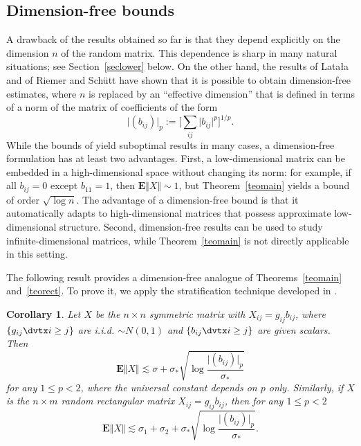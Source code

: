 \documentclass[aop,MSNbibl,dvips]{arximspdf}
\newcommand{\rrvert}{\vert}
\newcommand{\rrVert}{\Vert}
\newcommand{\llvert}{\vert}
\newcommand{\llVert}{\Vert}
\newtheorem{cor}[teo]{Corollary}
\newcommand{\EE}{\mathbf{E}}
\begin{document}
\subsection{Dimension-free bounds}\label{secdimfree}

A drawback of the results obtained so far is that they depend explicitly
on the dimension $n$ of the random matrix. This dependence is sharp in
many natural situations; see Section~\ref{seclower} below. On the other
hand, the results of Lata{\l}a \cite{Lat05} and of Riemer and Sch\"utt
\cite{RS13} have shown that it is possible to obtain dimension-free
estimates, where $n$ is replaced by an ``effective dimension'' that is
defined in terms of a norm of the matrix of coefficients of the form
%
\[
\bigl\llvert(b_{ij})\bigr\rrvert_p := \biggl[\sum
_{ij} \llvert b_{ij}\rrvert^p
\biggr]^{1/p}. %
\]
%
While the bounds of \cite{Lat05,RS13} yield
suboptimal results in many cases, a dimension-free formulation has at
least two advantages. First, a low-dimen\-sional matrix can be embedded in
a high-dimensional space without changing its norm: for example, if all
$b_{ij}=0$ except $b_{11}=1$, then $\EE\llVert X\rrVert \sim1$, but
Theorem~\ref{teomain} yields a bound of order $\sqrt{\log n}$. The
advantage of
a dimension-free bound is that it automatically adapts to high-dimensional
matrices that possess approximate low-dimensional structure. Second,
dimension-free results can be used to study infinite-dimensional matrices,
while Theorem~\ref{teomain} is not directly applicable in this setting.

The following result provides a dimension-free analogue of
Theorems~\ref{teomain} and~\ref{teorect}. To prove it, we apply the
stratification technique developed in \cite{RS13}.

%
\begin{cor}
\label{cordimfree}
Let $X$ be the $n\times n$ symmetric matrix with
$X_{ij}=g_{ij}b_{ij}$, where $\{g_{ij}\dvtx i\ge j\}$ are i.i.d. $\sim N(0,1)$
and $\{b_{ij}\dvtx i\ge j\}$ are given scalars. Then
%
\[
\EE\llVert X\rrVert\lesssim\sigma+ \sigma_* \sqrt{\log\frac{\llvert
(b_{ij})\rrvert _p}{\sigma_*}}
%
\]
%
for any $1\le p<2$, where the universal constant depends on $p$ only.
Similarly, if $X$ is the $n\times m$ random rectangular matrix
$X_{ij}=g_{ij}b_{ij}$, then for any $1\le p<2$
%
\[
\EE\llVert X\rrVert\lesssim\sigma_1 + \sigma_2 +
\sigma_* \sqrt{\log\frac{\llvert (b_{ij})\rrvert _p}{\sigma_*}}. %
\]
%
\end{cor}
\end{document}
